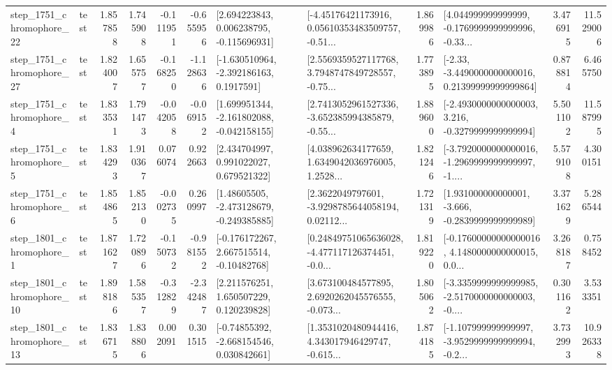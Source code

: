 \begin{tabular}{llrrrrllrlrr}
 step\_1751\_chromophore\_22 &      test &      1.857858 &    1.745908 &     -0.111951 & -0.655956 &    [2.694223843, 0.006238795, -0.115696931] &  [-4.45176421173916, 0.05610353483509757, -0.51... &       1.869986 &  [4.044999999999999, -0.1769999999999996, -0.33... &            3.476915 &         11.529006 \\
 step\_1751\_chromophore\_27 &      test &      1.824007 &    1.655757 &     -0.168250 & -1.128636 &     [-1.630510964, -2.392186163, 0.1917591] &  [2.5569359527117768, 3.7948747849728557, -0.75... &       1.773895 &  [-2.33, -3.4490000000000016, 0.21399999999999864] &            0.878814 &          6.465750 \\
  step\_1751\_chromophore\_4 &      test &      1.833531 &    1.791473 &     -0.042058 & -0.069152 &   [1.699951344, -2.161802088, -0.042158155] &  [2.7413052961527336, -3.652385994385879, -0.55... &       1.889600 &  [-2.4930000000000003, 3.216, -0.3279999999999994] &            5.501102 &         11.587995 \\
  step\_1751\_chromophore\_5 &      test &      1.834293 &    1.910367 &      0.076074 &  0.922663 &     [2.434704997, 0.991022027, 0.679521322] &  [4.038962634177659, 1.6349042036976005, 1.2528... &       1.821246 &  [-3.7920000000000016, -1.2969999999999997, -1.... &            5.579108 &          4.300151 \\
  step\_1751\_chromophore\_6 &      test &      1.854865 &    1.852130 &     -0.002735 &  0.260997 &    [1.48605505, -2.473128679, -0.249385885] &  [2.3622049797601, -3.9298785644058194, 0.02112... &       1.721319 &   [1.931000000000001, -3.666, -0.2839999999999989] &            3.371629 &          5.286544 \\
  step\_1801\_chromophore\_1 &      test &      1.871627 &    1.720896 &     -0.150732 & -0.981552 &    [-0.176172267, 2.667515514, -0.10482768] &  [0.24849751065636028, -4.477117126374451, -0.0... &       1.819220 &  [-0.17600000000000016, 4.1480000000000015, 0.0... &            3.268187 &          0.758452 \\
 step\_1801\_chromophore\_10 &      test &      1.898186 &    1.585357 &     -0.312829 & -2.342487 &     [2.211576251, 1.650507229, 0.120239828] &  [3.673100484577895, 2.6920262045576555, -0.073... &       1.805062 &  [-3.3359999999999985, -2.5170000000000003, -0.... &            0.301162 &          3.533351 \\
 step\_1801\_chromophore\_13 &      test &      1.836715 &    1.838806 &      0.002091 &  0.301515 &    [-0.74855392, -2.668154546, 0.030842661] &  [1.3531020480944416, 4.343017946429747, -0.615... &       1.874185 &  [-1.107999999999997, -3.9529999999999994, -0.2... &            3.732993 &         10.926338 \\

\end{tabular}

